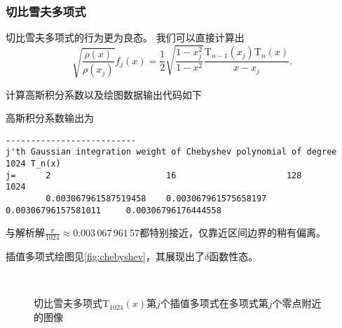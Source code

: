 \documentclass[a4paper,unicode]{report}
\begin{document}
\subsubsection{切比雪夫多项式}
切比雪夫多项式的行为更为良态。
我们可以直接计算出
\begin{equation}
    \sqrt{\frac{\rho(x)}{\rho(x_j)}}f_j(x)
    = \frac{1}{2} \sqrt{\frac{1-x_j^2}{1-x^2}} \frac{\mathrm{T}_{n-1}(x_j)\mathrm{T}_n(x)}{x - x_j}.
\end{equation}

计算高斯积分系数以及绘图数据输出代码如下
{
    \linespread{1.0}
    
}

高斯积分系数输出为
{
\footnotesize
\begin{verbatim}
--------------------------
j'th Gaussian integration weight of Chebyshev polynomial of degree 1024 T_n(x)
j=      2                       16                      128                     1024
        0.003067961587519458    0.003067961575658197    0.00306796157581011     0.00306796176444558
\end{verbatim}
}
与解析解$\frac{\pi}{1024} \approx 0.003\,067\,961\,57$都特别接近，仅靠近区间边界的稍有偏离。

插值多项式绘图见\autoref{fig:chebyshev}，其展现出了$\delta$函数性态。

\begin{figure}
    \centering
    \\
    \caption{切比雪夫多项式$\mathrm{T}_{1024}(x)$第$j$个插值多项式在多项式第$j$个零点附近的图像}
    \label{fig:chebyshev}
\end{figure}
\end{document}
